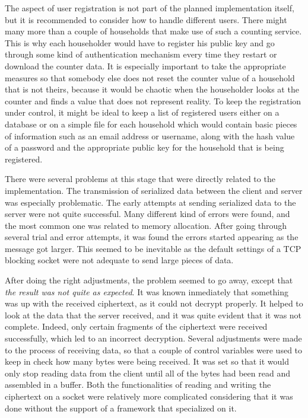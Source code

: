 The aspect of user registration is not part of the planned implementation itself, but it is recommended to consider how to handle different users. There might many more than a couple of households that make use of such a counting service. This is why each householder would have to register his public key and go through some kind of authentication mechanism every time they restart or download the counter data. It is especially important to take the appropriate measures so that somebody else does not reset the counter value of a household that is not theirs, because it would be chaotic when the householder looks at the counter and finds a value that does not represent reality.
To keep the registration under control, it might be ideal to keep a list of registered users either on a database or on a simple file for each household which would contain basic pieces of information such as an email address or username, along with the hash value of a password and the appropriate public key for the household that is being registered.

There were several problems at this stage that were directly related to the implementation. The transmission of serialized data between the client and server was especially problematic. The early attempts at sending serialized data to the server were not quite successful. Many different kind of errors were found, and the most common one was related to memory allocation. After going through several trial and error attempts, it was found the errors started appearing as the message got larger. This seemed to be inevitable as the default settings of a TCP blocking socket were not adequate to send large pieces of data. 

After doing the right adjustments, the problem seemed to go away, except that \textit{the result was not quite as expected}. It was known inmediately that something was up with the received ciphertext, as it could not decrypt properly. It helped to look at the data that the server received, and it was quite evident that it was not complete. Indeed, only certain fragments of the ciphertext were received successfully, which led to an incorrect decryption. Several adjustments were made to the process of receiving data, so that a couple of control variables were used to keep in check how many bytes were being received. It was set so that it would only stop reading data from the client until all of the bytes had been read and assembled in a buffer. Both the functionalities of reading and writing the ciphertext on a socket were relatively more complicated considering that it was done without the support of a framework that specialized on it.

